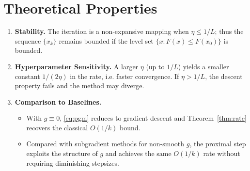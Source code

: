 \documentclass[11pt]{article}
\begin{document}
\section*{Theoretical Properties}
\begin{enumerate}[label={\arabic*.}]
\item \textbf{Stability.} The iteration is a non‑expansive mapping when $\eta\le1/L$; thus the sequence $\{x_{k}\}$ remains bounded if the level set $\{x:F(x)\le F(x_{0})\}$ is bounded.
\item \textbf{Hyperparameter Sensitivity.} A larger $\eta$ (up to $1/L$) yields a smaller constant $1/(2\eta)$ in the rate, i.e. faster convergence. If $\eta>1/L$, the descent property fails and the method may diverge.
\item \textbf{Comparison to Baselines.}
    \begin{itemize}
        \item With $g\equiv0$, \eqref{eq:pgm} reduces to gradient descent and Theorem~\ref{thm:rate} recovers the classical $O(1/k)$ bound.
        \item Compared with subgradient methods for non‑smooth $g$, the proximal step exploits the structure of $g$ and achieves the same $O(1/k)$ rate without requiring diminishing stepsizes.
    \end{itemize}
\end{enumerate}
\end{document}
